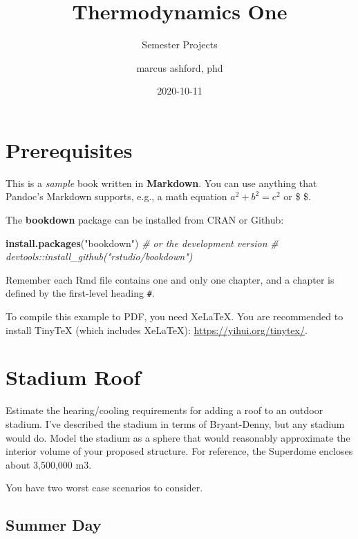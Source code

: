 \documentclass[
]{book}
\title{Thermodynamics One}
\subtitle{Semester Projects}
\author{marcus ashford, phd}
\date{2020-10-11}
\newenvironment{Shaded}{\begin{snugshade}}{\end{snugshade}}
\newcommand{\CommentTok}[1]{\textcolor[rgb]{0.56,0.35,0.01}{\textit{#1}}}
\newcommand{\KeywordTok}[1]{\textcolor[rgb]{0.13,0.29,0.53}{\textbf{#1}}}
\newcommand{\NormalTok}[1]{#1}
\newcommand{\StringTok}[1]{\textcolor[rgb]{0.31,0.60,0.02}{#1}}
\begin{document}
\maketitle

{
\setcounter{tocdepth}{1}
\tableofcontents
}
\hypertarget{prerequisites}{%
\chapter{Prerequisites}\label{prerequisites}}

This is a \emph{sample} book written in \textbf{Markdown}. You can use anything that Pandoc's Markdown supports, e.g., a math equation \(a^2 + b^2 = c^2\) or \$  \$.

The \textbf{bookdown} package can be installed from CRAN or Github:

\begin{Shaded}
\begin{Highlighting}[]
\KeywordTok{install.packages}\NormalTok{(}\StringTok{"bookdown"}\NormalTok{)}
\CommentTok{\# or the development version}
\CommentTok{\# devtools::install\_github("rstudio/bookdown")}
\end{Highlighting}
\end{Shaded}

Remember each Rmd file contains one and only one chapter, and a chapter is defined by the first-level heading \texttt{\#}.

To compile this example to PDF, you need XeLaTeX. You are recommended to install TinyTeX (which includes XeLaTeX): \url{https://yihui.org/tinytex/}.

\mainmatter

\hypertarget{stadium-roof}{%
\chapter{Stadium Roof}\label{stadium-roof}}

Estimate the hearing/cooling requirements for adding a roof to an outdoor stadium. I've described the stadium in terms of Bryant-Denny, but any stadium would do. Model the stadium as a sphere that would reasonably approximate the interior volume of your proposed structure. For reference, the Superdome encloses about 3,500,000 m3.

You have two worst case scenarios to consider.

\hypertarget{summer-day}{%
\section{Summer Day}\label{summer-day}}
\end{document}

